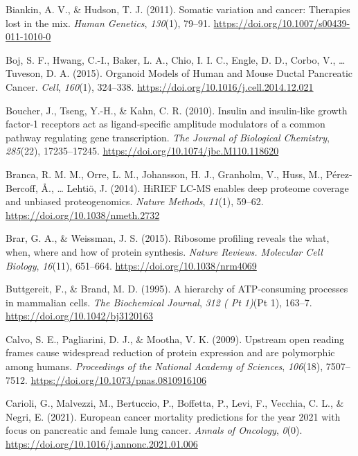 \documentclass[12pt,openany]{book}
\begin{document}
\hypertarget{ref-Biankin2011}{}
Biankin, A. V., \& Hudson, T. J. (2011). Somatic variation and cancer:
Therapies lost in the mix. \emph{Human Genetics}, \emph{130}(1), 79--91.
\url{https://doi.org/10.1007/s00439-011-1010-0}

\hypertarget{ref-Boj2015}{}
Boj, S. F., Hwang, C.-I., Baker, L. A., Chio, I. I. C., Engle, D. D.,
Corbo, V., \ldots{} Tuveson, D. A. (2015). Organoid Models of Human and
Mouse Ductal Pancreatic Cancer. \emph{Cell}, \emph{160}(1), 324--338.
\url{https://doi.org/10.1016/j.cell.2014.12.021}

\hypertarget{ref-Boucher2010}{}
Boucher, J., Tseng, Y.-H., \& Kahn, C. R. (2010). Insulin and
insulin-like growth factor-1 receptors act as ligand-specific amplitude
modulators of a common pathway regulating gene transcription. \emph{The
Journal of Biological Chemistry}, \emph{285}(22), 17235--17245.
\url{https://doi.org/10.1074/jbc.M110.118620}

\hypertarget{ref-Branca2014}{}
Branca, R. M. M., Orre, L. M., Johansson, H. J., Granholm, V., Huss, M.,
Pérez-Bercoff, Å., \ldots{} Lehtiö, J. (2014). HiRIEF LC-MS enables deep
proteome coverage and unbiased proteogenomics. \emph{Nature Methods},
\emph{11}(1), 59--62. \url{https://doi.org/10.1038/nmeth.2732}

\hypertarget{ref-Brar2015}{}
Brar, G. A., \& Weissman, J. S. (2015). Ribosome profiling reveals the
what, when, where and how of protein synthesis. \emph{Nature Reviews.
Molecular Cell Biology}, \emph{16}(11), 651--664.
\url{https://doi.org/10.1038/nrm4069}

\hypertarget{ref-Buttgereit1995}{}
Buttgereit, F., \& Brand, M. D. (1995). A hierarchy of ATP-consuming
processes in mammalian cells. \emph{The Biochemical Journal}, \emph{312
( Pt 1)}(Pt 1), 163--7. \url{https://doi.org/10.1042/bj3120163}

\hypertarget{ref-Calvo2009}{}
Calvo, S. E., Pagliarini, D. J., \& Mootha, V. K. (2009). Upstream open
reading frames cause widespread reduction of protein expression and are
polymorphic among humans. \emph{Proceedings of the National Academy of
Sciences}, \emph{106}(18), 7507--7512.
\url{https://doi.org/10.1073/pnas.0810916106}

\hypertarget{ref-Carioli2021}{}
Carioli, G., Malvezzi, M., Bertuccio, P., Boffetta, P., Levi, F.,
Vecchia, C. L., \& Negri, E. (2021). European cancer mortality
predictions for the year 2021 with focus on pancreatic and female lung
cancer. \emph{Annals of Oncology}, \emph{0}(0).
\url{https://doi.org/10.1016/j.annonc.2021.01.006}
\end{document}
